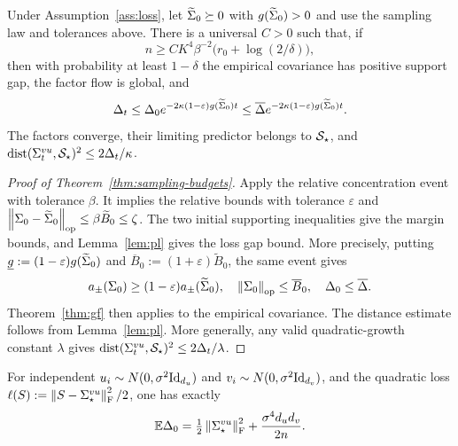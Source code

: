 \begin{theorem}
\label{thm:sampling-budgets}
Under Assumption~\ref{ass:loss}, let $\widetilde\Sigma_0\succeq0$ with
$g(\widetilde\Sigma_0)>0$ and use the sampling law and tolerances above.
There is a universal $C>0$ such that, if
\begin{equation}\label{eq:budget-width}
 n\ge CK^4\beta^{-2}\bigl(r_0+\log(2/\delta)\bigr),
\end{equation}
then with probability at least $1-\delta$ the empirical covariance has
positive support gap, the factor flow is global, and
\[
 \Delta_t\le\Delta_0e^{-2\kappa(1-\varepsilon)g(\widetilde\Sigma_0)t}
 \le\overline\Delta e^{-2\kappa(1-\varepsilon)g(\widetilde\Sigma_0)t}.
\]
The factors converge, their limiting predictor belongs to $\mathcal S_\star$, and
$\operatorname{dist}(\Sigma^{vu}_t,\mathcal S_\star)^2\le2\Delta_t/\kappa$.
\end{theorem}

\begin{proof}[Proof of Theorem~\ref{thm:sampling-budgets}]
Apply the relative concentration event with tolerance $\beta$.
It implies the relative bounds with tolerance $\varepsilon$ and
$\left\lVert \Sigma_0-\widetilde\Sigma_0 \right\rVert_{\mathrm{op}}\le\beta \widetilde B_0\le\zeta$.
The two initial supporting inequalities give the margin bounds, and
Lemma~\ref{lem:pl} gives the loss gap bound. More precisely, putting
$\underline g:=(1-\varepsilon)g(\widetilde\Sigma_0)$ and $\overline B_0:=(1+\varepsilon)\widetilde B_0$,
the same event gives
\begin{equation}\label{eq:sampling-event}
 a_\pm(\Sigma_0)\ge(1-\varepsilon)a_\pm(\widetilde\Sigma_0),\quad
 \left\lVert \Sigma_0 \right\rVert_{\mathrm{op}}\le\overline B_0,\quad
 \Delta_0\le\overline\Delta.
\end{equation}
Theorem~\ref{thm:gf} then applies
to the empirical covariance. The distance estimate follows from
Lemma~\ref{lem:pl}. More generally, any valid quadratic-growth constant
$\lambda$ gives $\operatorname{dist}(\Sigma^{vu}_t,\mathcal S_\star)^2\le2\Delta_t/\lambda$.
\end{proof}
\begin{proposition}\label{prop:gaussian}
For independent $u_i\sim N(0,\sigma^2\mathrm{Id}_{d_u})$ and
$v_i\sim N(0,\sigma^2\mathrm{Id}_{d_v})$, and the quadratic loss
$\ell(S):=\left\lVert S-\Sigma^{vu}_\star \right\rVert_{\mathrm{F}}^2/2$, one has exactly
\begin{equation}\label{eq:gaussian-error}
 \mathbb E\Delta_0
 =\tfrac12\left\lVert \Sigma^{vu}_\star \right\rVert_{\mathrm{F}}^2+\frac{\sigma^4d_ud_v}{2n}.
\end{equation}
\end{proposition}

